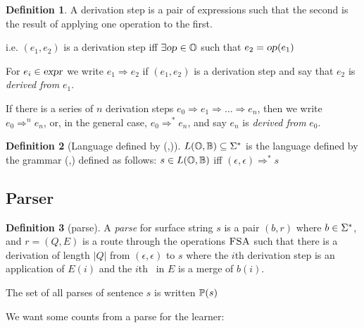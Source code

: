 \documentclass[12pt]{article}
\theoremstyle{definition}
\newtheorem{definition}{Definition}[section]
\begin{document}
\begin{definition}
  A derivation step is a pair of expressions such that the second is the result of applying one operation to the first.

  i.e.  $(e_1,e_2)$ is a derivation step iff $\exists \text{\textsl{op}}\in\mathbb{O}$ such that $e_2=\text{\textsl{op}}(e_1)$

  For $e_i\in\text{\textsl{expr}}$  we write $e_1 \Rightarrow e_2$ if $(e_1,e_2)$ is a derivation step and say that $e_2$ is \textit{derived from} $e_1$.

  If there is a series of $n$ derivation steps $e_0\Rightarrow e_1 \Rightarrow \dots \Rightarrow e_n$, then we write $e_0\Rightarrow^n e_n$, or, in the general case, $e_0\Rightarrow^* e_n$, and say  $e_n$ is \textit{derived from} $e_0$. 


\end{definition}

\begin{definition}[Language defined by (\OPS,\BIGR)]
$L(\mathbb{O},\mathbb{B})\subseteq\Sigma^*$ is the language defined by the grammar (\OPS,\BIGR) defined as follows:   $s\in L(\mathbb{O},\mathbb{B})$ iff $(\epsilon,\epsilon)\Rightarrow^*s$
\end{definition}


\subsection{Parser}
\label{sec:parser}



\begin{definition}[parse]

A \textit{parse} for surface string $s$ is a pair $(b,r)$ where $b\in\Sigma^*$, and $r=(Q,E)$ is a route through the operations $\textsc{FSA}$ such that there is a derivation of length $|Q|$ from
 $(\epsilon,\epsilon)$ to  $s$ where the $i$th derivation step is an application of $E(i)$ and the $i$th \mg~in $E$ is a merge of $b(i)$.

The set of all parses of sentence $s$ is written $\mathbb{P}(s)$
\end{definition}

\noindent We want some counts from a parse for the learner:
\end{document}
